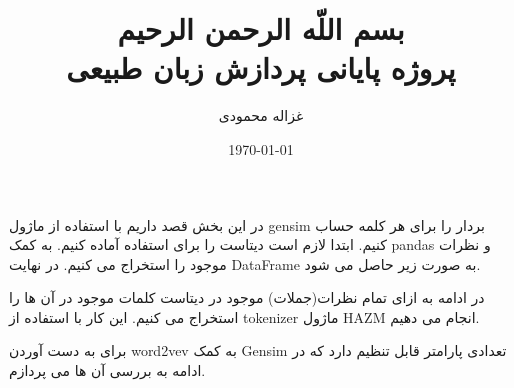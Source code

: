 \documentclass[10pt]{article}
\begin{document}
\title{بسم اللّه الرحمن الرحیم
	\\[25pt]	پروژه پایانی پردازش زبان طبیعی
}
\author{غزاله محمودی}

\date{\today}
\maketitle
\newpage

\tableofcontents
\newpage

\listoffigures
\newpage

\listoftables
\newpage
	
\section{ 
}
در این بخش قصد داریم با استفاده از ماژول gensim بردار
  را برای هر کلمه حساب کنیم.
ابتدا لازم است دیتاست را برای استفاده آماده کنیم. به کمک pandas و نظرات موجود را استخراج می کنیم. در نهایت DataFrame به صورت زیر حاصل می شود.


در ادامه به ازای تمام نظرات(جملات) موجود در دیتاست کلمات موجود در آن ها را استخراج می کنیم. این کار با استفاده از tokenizer ماژول HAZM انجام می دهیم. 


برای به دست آوردن word2vev به کمک Gensim تعدادی پارامتر قابل تنظیم دارد که در ادامه به بررسی آن ها می پردازم.
\end{document}
